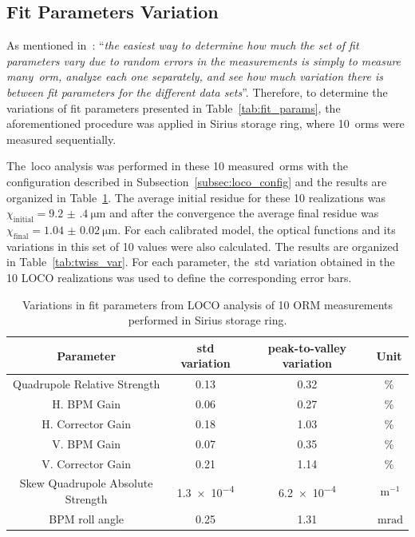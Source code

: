 \subsection{Fit Parameters Variation}
As mentioned in~\cite{safranek1997}: ``\textit{the easiest way to determine how much the set of fit parameters vary due to random errors in the measurements is simply to measure many~\gls{orm}, analyze each one separately, and see how much variation there is between fit parameters for the different data sets}''. Therefore, to determine the variations of fit parameters presented in Table~\ref{tab:fit_params}, the aforementioned procedure was applied in Sirius storage ring, where 10~\glspl{orm} were measured sequentially. 

The~\gls{loco} analysis was performed in these 10 measured~\glspl{orm} with the configuration described in Subsection~\ref{subsec:loco_config} and the results are organized in Table~\ref{tab:fit_var}. The average initial residue for these 10 realizations was $\chi_{\mathrm{initial}} = \SI{9.2(4)}{\micro\meter}$ and after the convergence the average final residue was $\chi_{\mathrm{final}} = \SI{1.04(2)}{\micro\meter}$. For each calibrated model, the optical functions and its variations in this set of 10 values were also calculated. The results are organized in Table~\ref{tab:twiss_var}. For each parameter, the~\gls{std} variation obtained in the 10 LOCO realizations was used to define the corresponding error bars.
\begin{table}
    \centering
    \caption{Variations in fit parameters from LOCO analysis of 10 ORM measurements performed in Sirius storage ring.}
    \label{tab:fit_var}
    \begin{tabular}{cccc}
        \toprule\toprule
        Parameter & std variation & peak-to-valley variation & Unit \\
        \hline
        Quadrupole Relative Strength     & 0.13 & 0.32 & \% \\  
        H. BPM Gain             & 0.06 & 0.27 & \%\\
        H. Corrector Gain       & 0.18 & 1.03 & \%\\
        V. BPM  Gain             & 0.07 & 0.35 & \%\\
        V. Corrector Gain       & 0.21 & 1.14 & \%\\
        Skew Quadrupole Absolute Strength& \num{1.3e-4} & \num{6.2e-4} & $\SI{}{\meter^{-1}}$\\
        BPM roll angle                & 0.25 & 1.31 & $\SI{}{\milli\radian}$ \\
        \bottomrule\bottomrule
    \end{tabular}
\end{table}
